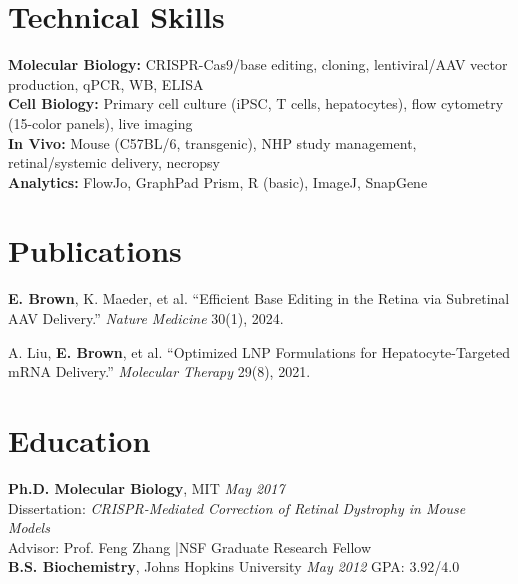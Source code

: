 \documentclass[11pt,a4paper]{article}
\begin{document}
\section{Technical Skills}
\textbf{Molecular Biology:} CRISPR-Cas9/base editing, cloning, lentiviral/AAV vector production, qPCR, WB, ELISA\\
\textbf{Cell Biology:} Primary cell culture (iPSC, T cells, hepatocytes), flow cytometry (15-color panels), live imaging\\
\textbf{In Vivo:} Mouse (C57BL/6, transgenic), NHP study management, retinal/systemic delivery, necropsy\\
\textbf{Analytics:} FlowJo, GraphPad Prism, R (basic), ImageJ, SnapGene

\section{Publications}
\begin{enumerate}[leftmargin=*, label={[\arabic*]}]
  \item \textbf{E. Brown}, K. Maeder, et al. ``Efficient Base Editing in the Retina via Subretinal AAV Delivery.'' \textit{Nature Medicine} 30(1), 2024.
  \item A. Liu, \textbf{E. Brown}, et al. ``Optimized LNP Formulations for Hepatocyte-Targeted mRNA Delivery.'' \textit{Molecular Therapy} 29(8), 2021.
\end{enumerate}

\section{Education}
\textbf{Ph.D. Molecular Biology}, MIT \hfill \textit{May 2017}\\
Dissertation: \textit{CRISPR-Mediated Correction of Retinal Dystrophy in Mouse Models}\\
Advisor: Prof. Feng Zhang \quad|\quad NSF Graduate Research Fellow\\[3pt]
\textbf{B.S. Biochemistry}, Johns Hopkins University \hfill \textit{May 2012} \quad GPA: 3.92/4.0
\end{document}
